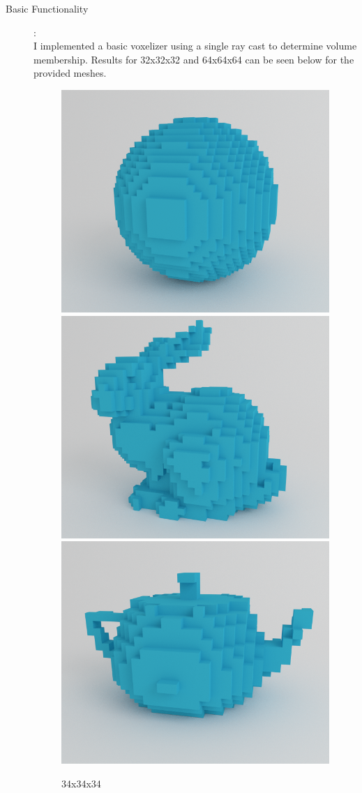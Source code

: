 \documentclass {article}
\begin{document}
	\newpage
	\begin{description}
		\item[Basic Functionality]:\\
		
		I implemented a basic voxelizer using a single ray cast to determine volume membership. Results for 32x32x32 and 64x64x64 can be seen below for the provided meshes. 
		
		\begin{figure}[ht!]
			\includegraphics[width=.3\textwidth]{../data/renders/sphere32}\hfill
			\includegraphics[width=.3\textwidth]{../data/renders/bunny32}\hfill
			\includegraphics[width=.3\textwidth]{../data/renders/teapot32}
			\caption{34x34x34}
		\end{figure}
		

\end{description}
\end{document}
